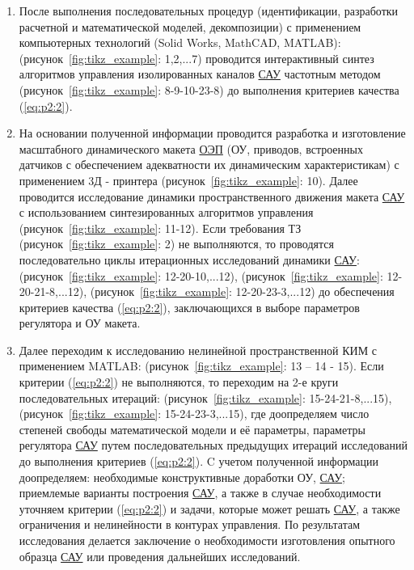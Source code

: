 \begin{enumerate}
	\item После выполнения последовательных процедур (идентификации, разработки расчетной и математической моделей, декомпозиции) с применением компьютерных технологий (Solid Works, MathCAD, MATLAB): (рисунок~\ref{fig:tikz_example}: 1,2,...7) проводится интерактивный синтез алгоритмов управления изолированных каналов \hyperref[acroSAU]{САУ} частотным методом \cite[]{Bessekerski20} (рисунок~\ref{fig:tikz_example}: 8-9-10-23-8) до выполнения критериев качества (\ref{eq:p2:2}). 
	\item На основании полученной информации проводится разработка и изготовление масштабного динамического макета \hyperref[acroEOS]{ОЭП} (ОУ, приводов, встроенных датчиков с обеспечением адекватности их динамическим характеристикам) с применением 3Д - принтера (рисунок~\ref{fig:tikz_example}: 10). Далее проводится исследование динамики пространственного движения макета \hyperref[acroSAU]{САУ} с использованием синтезированных алгоритмов управления (рисунок~\ref{fig:tikz_example}: 11-12). Если требования ТЗ (рисунок~\ref{fig:tikz_example}: 2) не выполняются, то проводятся последовательно циклы итерационных исследований динамики \hyperref[acroSAU]{САУ}: (рисунок~\ref{fig:tikz_example}: 12-20-10,...12), (рисунок~\ref{fig:tikz_example}: 12-20-21-8,...12), (рисунок~\ref{fig:tikz_example}: 12-20-23-3,...12) до обеспечения критериев качества (\ref{eq:p2:2}), заключающихся в выборе параметров регулятора и ОУ макета.
	\item Далее переходим к исследованию нелинейной пространственной КИМ с применением MATLAB: 
	(рисунок~\ref{fig:tikz_example}: 13 – 14 - 15). Если критерии (\ref{eq:p2:2}) не выполняются, то переходим на 2-е круги последовательных итераций: (рисунок~\ref{fig:tikz_example}: 15-24-21-8,...15), (рисунок~\ref{fig:tikz_example}: 15-24-23-3,...15), где доопределяем число степеней свободы математической модели и её параметры, параметры регулятора \hyperref[acroSAU]{САУ} путем последовательных предыдущих итераций исследований до выполнения критериев (\ref{eq:p2:2}). C учетом полученной информации доопределяем: необходимые конструктивные доработки ОУ, \hyperref[acroSAU]{САУ}; приемлемые варианты построения \hyperref[acroSAU]{САУ}, а также в случае необходимости уточняем критерии (\ref{eq:p2:2}) и задачи, которые может решать \hyperref[acroSAU]{САУ}, а также ограничения и нелинейности в контурах управления. По результатам исследования делается заключение о необходимости изготовления опытного образца \hyperref[acroSAU]{САУ} или проведения дальнейших исследований.
	

\end{enumerate}
